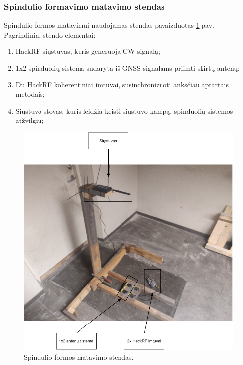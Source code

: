 \documentclass[main.tex]{subfiles}
\begin{document}
\subsubsection{Spindulio formavimo matavimo stendas}\label{sec:beamform_meas_stand}

Spindulio formos matavimui naudojamas stendas pavaizduotas \ref{fig:beamform_stand}
pav. Pagrindiniai stendo elementai:

\begin{enumerate}
    \item HackRF siųstuvas, kuris generuoja CW signalą;
    \item 1x2 spinduolių sistema sudaryta iš GNSS signalams priimti skirtų antenų;
    \item Du HackRF koherentiniai imtuvai, susinchronizuoti anksčiau aptartais metodais;
    \item Siųstuvo stovas, kuris leidžia keisti siųstuvo kampą, spinduolių sistemos atžvilgiu;
\end{enumerate}

\begin{figure}[h]
    \begin{centering}
    \includegraphics[scale=1.0]{drawings/beamform_stand.drawio}
    \par\end{centering}
    \protect\caption{\label{fig:beamform_stand}Spindulio formos matavimo stendas.}
\end{figure}
\end{document}
